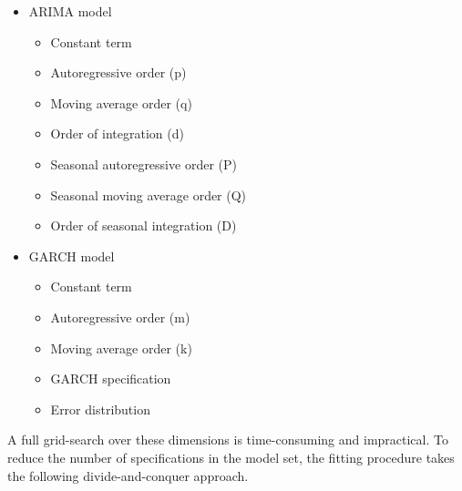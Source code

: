 \documentclass[12pt]{article}
\begin{document}
\begin{itemize}
    \item ARIMA model
        \begin{itemize}
            \item Constant term
            \item Autoregressive order (p)
            \item Moving average order (q)
            \item Order of integration (d)
            \item Seasonal autoregressive order (P)
            \item Seasonal moving average order (Q)
            \item Order of seasonal integration (D)
        \end{itemize}
        \item GARCH model
        \begin{itemize}
            \item Constant term
            \item Autoregressive order (m)
            \item Moving average order (k)
            \item GARCH specification
            \item Error distribution
        \end{itemize}

\end{itemize}

A full grid-search over these dimensions is time-consuming and impractical. To reduce the number of specifications in the model set, the fitting procedure takes the following divide-and-conquer approach.
\end{document}

